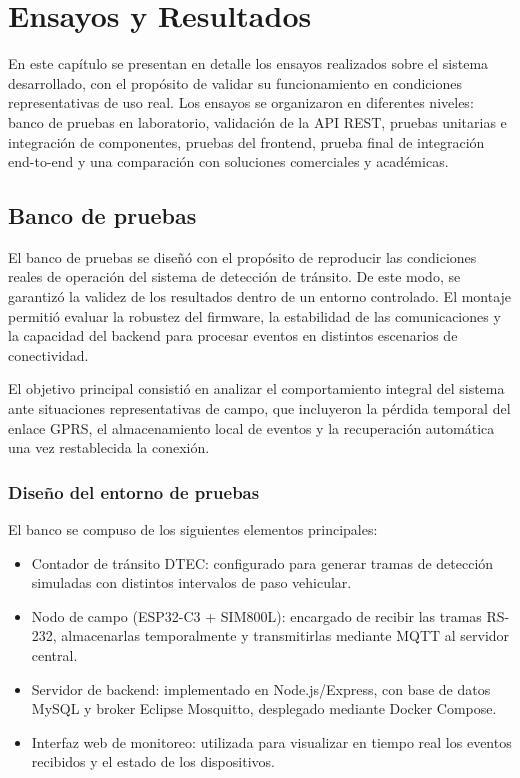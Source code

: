 \chapter{Ensayos y Resultados}

En este capítulo se presentan en detalle los ensayos realizados sobre el sistema desarrollado, con el propósito de validar su funcionamiento en condiciones representativas de uso real. 
Los ensayos se organizaron en diferentes niveles: banco de pruebas en laboratorio, validación de la API REST, pruebas unitarias e integración de componentes, 
pruebas del frontend, prueba final de integración end-to-end y una comparación con soluciones comerciales y académicas.  


\section{Banco de pruebas}

El banco de pruebas se diseñó con el propósito de reproducir las condiciones reales de operación del sistema de detección de tránsito. 
De este modo, se garantizó la validez de los resultados dentro de un entorno controlado. 
El montaje permitió evaluar la robustez del firmware, la estabilidad de las comunicaciones y la capacidad del backend para procesar eventos en distintos escenarios de conectividad.

El objetivo principal consistió en analizar el comportamiento integral del sistema ante situaciones representativas de campo, que incluyeron la pérdida temporal del enlace GPRS, el almacenamiento local de eventos y la recuperación automática una vez restablecida la conexión.

\subsection{Diseño del entorno de pruebas}

El banco se compuso de los siguientes elementos principales:

\begin{itemize}
    \item Contador de tránsito DTEC: configurado para generar tramas de detección simuladas con distintos intervalos de paso vehicular.
    \item Nodo de campo (ESP32-C3 + SIM800L): encargado de recibir las tramas RS-232, almacenarlas temporalmente y transmitirlas mediante MQTT al servidor central.
    \item Servidor de backend: implementado en Node.js/Express, con base de datos MySQL y broker Eclipse Mosquitto, desplegado mediante Docker Compose.
    \item Interfaz web de monitoreo: utilizada para visualizar en tiempo real los eventos recibidos y el estado de los dispositivos.
\end{itemize}

